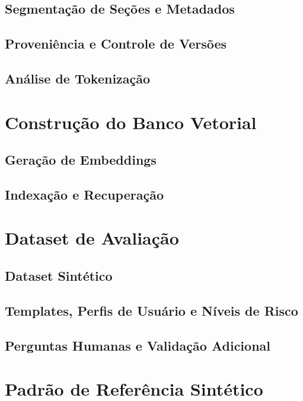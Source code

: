 \subsection{Segmentação de Seções e Metadados}

\subsection{Proveniência e Controle de Versões}

\subsection{Análise de Tokenização}


\section{Construção do Banco Vetorial}

\subsection{Geração de Embeddings}

\subsection{Indexação e Recuperação}

\section{Dataset de Avaliação}

\subsection{Dataset Sintético}

\subsection{Templates, Perfis de Usuário e Níveis de Risco}

\subsection{Perguntas Humanas e Validação Adicional}

\section{Padrão de Referência Sintético}

